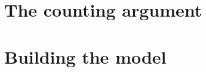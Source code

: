 \documentclass{book}
\begin{document}
\chapter{The counting argument}

\minitoc
\newpage








\chapter{Building the model}

\minitoc
\newpage












\printbibliography
\end{document}
